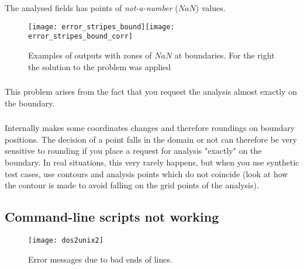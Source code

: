 The analysed fields has points of \textit{not-a-number} ($NaN$) values.

\begin{figure}[htpb]
\centering
\texttt{[image: error\_stripes\_bound]}\texttt{[image: error\_stripes\_bound\_corr]}
\caption[Examples of \diva outputs with zones of $NaN$ at boundaries.]{Examples of \diva outputs with zones of $NaN$ at boundaries. For the right the solution to the problem was applied \label{fig:error_stripes}}
\end{figure}

\subsubsection{\question}

This problem arises from the fact that you request the analysis almost exactly on the boundary.



\subsubsection{\answer}

Internally \diva makes some coordinates changes and therefore roundings on boundary positions. The decision of a point falls in the domain or not can therefore be very sensitive
to rounding if you place a request for analysis "exactly" on the boundary. In real situations, this very rarely happens, but when you use synthetic test cases, use contours and analysis points which do not coincide (look at  how the contour is made to avoid falling on the grid points of the analysis).



\subsection{Command-line scripts not working}


\begin{figure}[htpb]
\centering
\texttt{[image: dos2unix2]}
\caption{Error messages due to bad ends of lines. \label{fig:error_dos2unix}}
\end{figure}

\subsubsection{\question}

